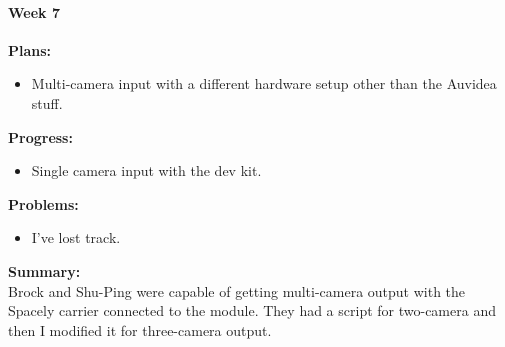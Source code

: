 \paragraph{Week 7}
\begin{adjustwidth}{2.5em}{0pt}
    \vspace{-0.5cm}\textbf{Plans:}
    \vspace{-0.5cm}
    \begin{itemize}
        \item Multi-camera input with a different hardware setup other than the Auvidea stuff.
    \end{itemize} 
    \vspace{-0.3cm}\textbf{Progress:}
    \vspace{-0.5cm}
    \begin{itemize}
        \item Single camera input with the dev kit. 
    \end{itemize} 
    \vspace{-0.3cm}\textbf{Problems:}
    \vspace{-0.5cm}
    \begin{itemize}
        \item I've lost track.
    \end{itemize}  
    \vspace{-0.3cm}\noindent\textbf{Summary:}\\
    \noindent Brock and Shu-Ping were capable of getting multi-camera output with the Spacely carrier connected to the module. They had a script for two-camera and then I modified it for three-camera output. 
\end{adjustwidth} 


